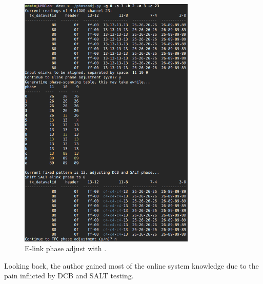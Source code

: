 \begin{figure}[!htb]
    \centering
    \includegraphics[width=0.75\textwidth]{./figs-ut-upgrade/online/elk_phase_adj.png}
    \caption{
        E-link phase adjust with \nanoDAQ.
    }
    \label{fig:nanodaq-phaseadj}
\end{figure}

Looking back, the author gained most of the online system knowledge due to the
pain inflicted by DCB and SALT testing.
